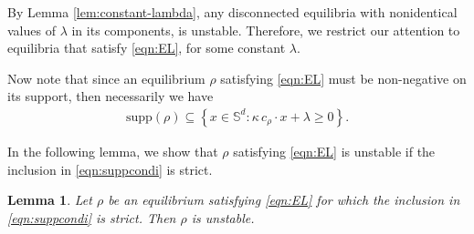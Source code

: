 \documentclass[11pt]{amsart}
\newtheorem{lemma}{Lemma}[section]
\newcommand{\bbs}{\mathbb S}
\newcommand{\supp}{\mathrm{supp}(\rho)}
\newcommand{\dm}{d} %
\begin{document}
By Lemma \ref{lem:constant-lambda}, any disconnected equilibria with nonidentical values of $\lambda$ in its components, is unstable. Therefore, we restrict our attention to equilibria that satisfy \eqref{eqn:EL}, for some constant $\lambda$.

Now note that since an equilibrium $\rho$ satisfying \eqref{eqn:EL} must be non-negative on its support, then necessarily we have
\begin{align}\label{eqn:suppcondi}
\supp\subseteq\left\{x\in\bbs^\dm:\kappa \, c_\rho\cdot x+\lambda\ge0\right\}.
\end{align}

In the following lemma, we show that $\rho$ satisfying \eqref{eqn:EL} is unstable if the inclusion in \eqref{eqn:suppcondi} is strict.
\begin{lemma}
\label{lem:supportcondi}
Let $\rho$ be an equilibrium satisfying \eqref{eqn:EL} for which the inclusion in \eqref{eqn:suppcondi} is strict. Then $\rho$ is unstable.
\end{lemma}
\end{document}
